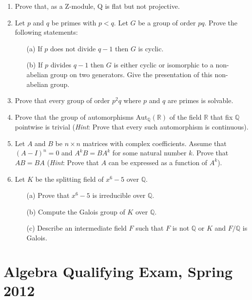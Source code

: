 \documentclass{article}
\begin{document}
\begin{enumerate}
    \item Prove that, as a Z-module, Q is flat but not projective.

    \item Let \(p\) and \(q\) be primes with \(p < q\). Let \(G\) be a group of order \(pq\). Prove the following statements:
    \begin{itemize}
        \item[(a)] If \(p\) does not divide \(q - 1\) then \(G\) is cyclic.
        \item[(b)] If \(p\) divides \(q - 1\) then \(G\) is either cyclic or isomorphic to a non-abelian group on two generators. Give the presentation of this non-abelian group.
    \end{itemize}

    \item Prove that every group of order \(p^2q\) where \(p\) and \(q\) are primes is solvable.

    \item Prove that the group of automorphisms \(\text{Aut}_\mathbb{Q}(\mathbb{R})\) of the field \(\mathbb{R}\) that fix \(\mathbb{Q}\) pointwise is trivial (\textit{Hint}: Prove that every such automorphism is continuous).

    \item Let \(A\) and \(B\) be \(n \times n\) matrices with complex coefficients. Assume that \((A - I)^n = 0\) and \(A^k B = BA^k\) for some natural number \(k\). Prove that \(AB = BA\) (\textit{Hint}: Prove that \(A\) can be expressed as a function of \(A^k\)).

    \item Let \(K\) be the splitting field of \(x^6 - 5\) over \(\mathbb{Q}\).
    \begin{itemize}
        \item[(a)] Prove that \(x^6 - 5\) is irreducible over \(\mathbb{Q}\).
        \item[(b)] Compute the Galois group of \(K\) over \(\mathbb{Q}\).
        \item[(c)] Describe an intermediate field \(F\) such that \(F\) is not \(\mathbb{Q}\) or \(K\) and \(F/\mathbb{Q}\) is Galois.
    \end{itemize}
\end{enumerate}

\section*{Algebra Qualifying Exam, Spring 2012}
\end{document}
